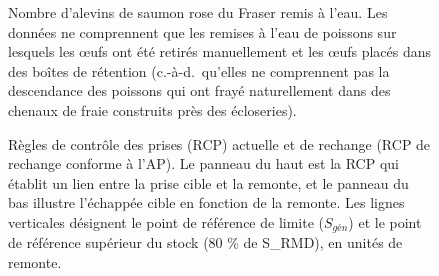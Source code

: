 \documentclass[french,11pt]{book}
\begin{document}
\begin{figure}[htb]

{\centering {} 

}

\caption{Nombre d'alevins de saumon rose du Fraser remis à l'eau. Les données ne comprennent que les remises à l'eau de poissons sur lesquels les œufs ont été retirés manuellement et les œufs placés dans des boîtes de rétention (c.-à-d.~qu'elles ne comprennent pas la descendance des poissons qui ont frayé naturellement dans des chenaux de fraie construits près des écloseries).}\label{fig:fig-hatch-cont}
\end{figure}

\begin{figure}[htb]

{\centering {} 

}

\caption{Règles de contrôle des prises (RCP) actuelle et de rechange (RCP de rechange conforme à l'AP). Le panneau du haut est la RCP qui établit un lien entre la prise cible et la remonte, et le panneau du bas illustre l'échappée cible en fonction de la remonte. Les lignes verticales désignent le point de référence de limite (\(S_{gén}\)) et le point de référence supérieur du stock (80 \% de S\_RMD), en unités de remonte.}\label{fig:fig-HCRs}
\end{figure}
\end{document}
